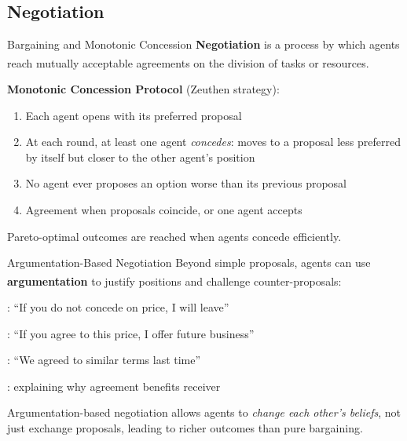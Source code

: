 \subsection{Negotiation}

\begin{v3topic}{Bargaining and Monotonic Concession}
    \textbf{Negotiation} is a process by which agents reach mutually acceptable
    agreements on the division of tasks or
    resources.\textsuperscript{\cite[][p.~185]{wooldridgeIntroductionMultiAgentSystems2009}}

    \textbf{Monotonic Concession Protocol} (Zeuthen strategy):
    \begin{enumerate}
        \item Each agent opens with its preferred proposal
        \item At each round, at least one agent \emph{concedes}: moves to a proposal
              less preferred by itself but closer to the other agent's position
        \item No agent ever proposes an option worse than its previous proposal
        \item Agreement when proposals coincide, or one agent accepts
    \end{enumerate}
    Pareto-optimal outcomes are reached when agents concede efficiently.

\end{v3topic}
\begin{v3topic}{Argumentation-Based Negotiation}
    Beyond simple proposals, agents can use \textbf{argumentation} to justify
    positions and challenge counter-proposals:\textsuperscript{\cite[][p.~191]{wooldridgeIntroductionMultiAgentSystems2009}}

    \begin{description}[leftmargin=0.6cm, labelindent=0pt]
        \item[\textbf{Threats}]: ``If you do not concede on price, I will leave''
        \item[\textbf{Rewards}]: ``If you agree to this price, I offer future business''
        \item[\textbf{Appeal to precedent}]: ``We agreed to similar terms last time''
        \item[\textbf{Appeal to self-interest}]: explaining why agreement benefits receiver
    \end{description}
    Argumentation-based negotiation allows agents to \emph{change each other's beliefs},
    not just exchange proposals, leading to richer outcomes than pure bargaining.

\end{v3topic}

